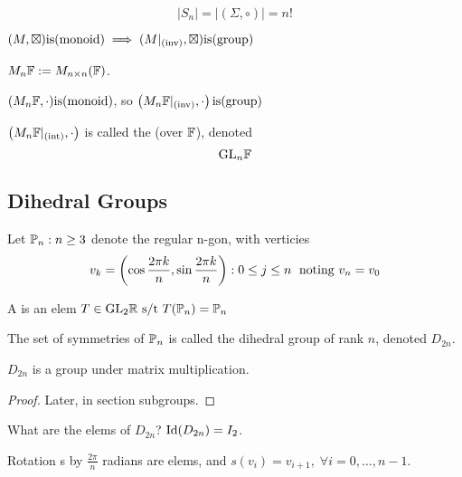 \documentclass[12pt]{article}
\newcommand{\gop}[0]{\boxtimes}
\begin{document}
\bboxex
\[|S_n|=|(\Sigma,\circ)|=n!\]
\ebox


\((M,\gop)\is\TM{monoid}
\implies(M|_{\TM{inv}},\gop)\is\TM{group}\)

\bboxex
{} \(M_n\mathbb F:=M_{n\times n}(\mathbb F)\).

\((M_n\mathbb F,\cdot)\mathrm{is}(\mathrm{monoid})\), so
\(\left(M_n\mathbb F|_{(\mathrm{inv})},\cdot\right)
\mathrm{is}(\mathrm{group})\)
\ebox


\bboxnote
\begin{nota}\label{nota:gen_L_group}
  \(\left(M_n\mathbb F|_{(\mathrm{int})},\cdot\right)\)
  is called the 
  (over \(\mathbb F\)), denoted
  \[\mathrm{GL}_n\mathbb F\]
\end{nota}
\ebox

\subsection{Dihedral Groups}
\bbox
\begin{defn}[N-Gon]\label{defn:n_gon}
  Let \(\mathbb P_n:n\ge3\) denote the regular
  n-gon, with verticies
  \[v_k=\left(
      \cos\frac{2\pi k}n,
      \sin\frac{2\pi k}n
  \right):0\le j\le n\;
\text{ noting }v_n=v_0\]
\end{defn}
\ebox

\bbox
\begin{defn}
  A  is an
  elem \(T\in\mathrm{GL}_2\mathbb R\text{ s/t }
  T(\mathbb P_n)=\mathbb P_n\)
\end{defn}
\ebox

\bbox
\begin{defn}\label{defn:dihedral_group}
  The set of symmetries of \(\mathbb P_n\) is called the dihedral group of rank \(n\), denoted \(D_{2n}\).
\end{defn}
\ebox

\bbox
\begin{lem}
  \(D_{2n}\) is a group under matrix multiplication.
\end{lem}
\ebox

\bboxproof
\begin{proof}
  Later, in section subgroups.
\end{proof}
\ebox

What are the elems of \(D_{2n}\)?
\(\mathrm{Id}(D_{2n})=I_2\).

Rotation s by \(\frac{2\pi}n\) radians are elems, and \(s(v_i)=v_{i+1},\;\forall i=0,\dots,n-1\).
\end{document}
